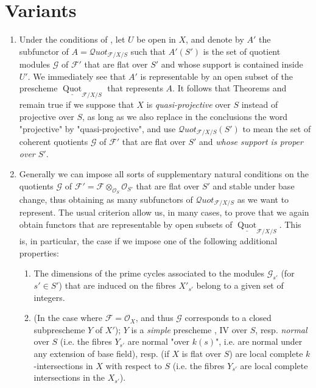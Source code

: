 \section{Variants}\label{fga3.iv-4}

\begin{enumerate}[label=\alph*.]
  \item Under the conditions of , let $U$ be open in $X$, and denote by $A'$ the subfunctor of $A=\mathcal{Q}uot_{\mathcal{F}/X/S}$ such that $A'(S')$ is the set of quotient modules $\mathcal{G}$ of $\mathcal{F}'$ that are flat over $S'$ and whose support is contained inside $U'$.
        We immediately see that $A'$ is representable by an open subset of the prescheme $\underline{\operatorname{Quot}}_{\mathcal{F}/X/S}$ that represents $A$.
        It follows that Theorems  and  remain true if we suppose that $X$ is \emph{quasi-projective} over $S$ instead of projective over $S$, as long as we also replace in the conclusions the word "projective" by "quasi-projective", and use $\mathcal{Q}uot_{\mathcal{F}/X/S}(S')$ to mean the set of coherent quotients $\mathcal{G}$ of $\mathcal{F}'$ that are flat over $S'$ and \emph{whose support is proper over $S'$}.
  \item Generally we can impose all sorts of supplementary natural conditions on the quotients $\mathcal{G}$ of $\mathcal{F}'=\mathcal{F}\otimes_{\mathcal{O}_S}\mathcal{O}_{S'}$ that are flat over $S'$ and stable under base change, thus obtaining as many subfunctors of $\mathcal{Q}uot_{\mathcal{F}/X/S}$ as we want to represent.
        The usual criterion allow us, in many cases, to prove that we again obtain functors that are representable by open subsets of $\underline{\operatorname{Quot}}_{\mathcal{F}/X/S}$.
        This is, in particular, the case if we impose one of the following additional properties:
        \begin{enumerate}
          \item The dimensions of the prime cycles associated to the modules $\mathcal{G}_{s'}$ (for $s'\in S'$) that are induced on the fibres $X'_{s'}$ belong to a given set of integers.
          \item (In the case where $\mathcal{F}=\mathcal{O}_X$, and thus $\mathcal{G}$ corresponds to a closed subprescheme $Y$ of $X'$); $Y$ is a \emph{simple} prescheme \cite{Gro1960b}, IV over $S$, resp. \emph{normal} over $S$ (i.e. the fibres $Y_{s'}$ are normal "over $k(s)$", i.e. are normal under any extension of base field), resp. (if $X$ is flat over $S$) are local complete $k$-intersections in $X$ with respect to $S$ (i.e. the fibres $Y_{s'}$ are local complete intersections in the $X_{s'}$).

\end{enumerate}
\end{enumerate}
